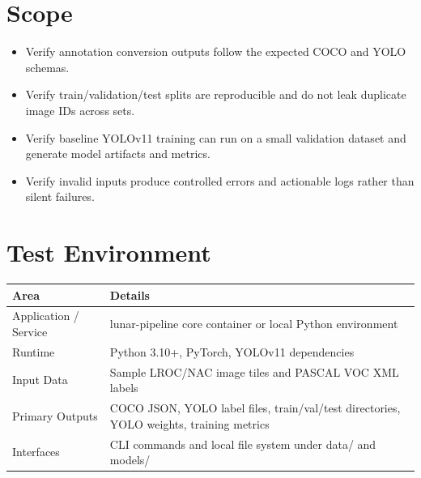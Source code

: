 \documentclass[11pt,landscape]{article}
\begin{document}
\section*{Scope}
\begin{itemize}[leftmargin=*]
\item Verify annotation conversion outputs follow the expected COCO and YOLO schemas.
\item Verify train/validation/test splits are reproducible and do not leak duplicate image IDs across sets.
\item Verify baseline YOLOv11 training can run on a small validation dataset and generate model artifacts and metrics.
\item Verify invalid inputs produce controlled errors and actionable logs rather than silent failures.
\end{itemize}
\section*{Test Environment}
\begin{longtable}{p{2.0in}p{7.6in}}\toprule\textbf{Area} & \textbf{Details}\\\midrule\endhead
Application / Service & lunar-pipeline core container or local Python environment \\
Runtime & Python 3.10+, PyTorch, YOLOv11 dependencies \\
Input Data & Sample LROC/NAC image tiles and PASCAL VOC XML labels \\
Primary Outputs & COCO JSON, YOLO label files, train/val/test directories, YOLO weights, training metrics \\
Interfaces & CLI commands and local file system under data/ and models/ \\
\bottomrule\end{longtable}
\end{document}
